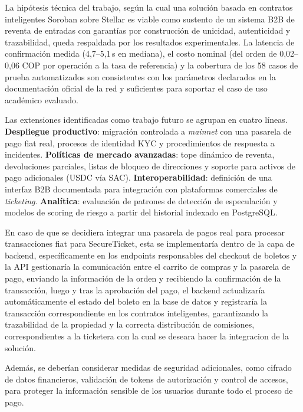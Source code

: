 La hipótesis técnica del trabajo, según la cual una solución basada en contratos inteligentes Soroban sobre
Stellar es viable como sustento de un sistema B2B de reventa de entradas con garantías por construcción de
unicidad, autenticidad y trazabilidad, queda respaldada por los resultados experimentales. La latencia de
confirmación medida (4{,}7--5{,}1\,s en mediana), el costo nominal (del orden de 0{,}02--0{,}06 COP por
operación a la tasa de referencia) y la cobertura de los 58 casos de prueba automatizados son consistentes
con los parámetros declarados en la documentación oficial de la red y suficientes para soportar el caso de
uso académico evaluado.

Las extensiones identificadas como trabajo futuro se agrupan en cuatro líneas. \textbf{Despliegue
productivo}: migración controlada a \textit{mainnet} con una pasarela de pago fiat real, procesos de
identidad KYC y procedimientos de respuesta a incidentes. \textbf{Políticas de mercado avanzadas}: tope
dinámico de reventa, devoluciones parciales, listas de bloqueo de direcciones y soporte para activos de pago
adicionales (USDC vía SAC). \textbf{Interoperabilidad}: definición de una interfaz B2B documentada para
integración con plataformas comerciales de \textit{ticketing}. \textbf{Analítica}: evaluación de patrones de
detección de especulación y modelos de scoring de riesgo a partir del historial indexado en PostgreSQL.

En caso de que se decidiera integrar una pasarela de pagos real para procesar transacciones fiat para SecureTicket, esta se implementaría dentro de la capa de backend, específicamente en los endpoints responsables del checkout de boletos y la API gestionaría la comunicación entre el carrito de compras y la pasarela de pago, enviando la información de la orden y recibiendo la confirmación de la transacción, luego y tras la aprobación del pago, el backend actualizaría automáticamente el estado del boleto en la base de datos y registraría la transacción correspondiente en los contratos inteligentes, garantizando la trazabilidad de la propiedad y la correcta distribución de comisiones, correspondientes a la ticketera con la cual se deseara hacer la integracion de la solución. 

Además, se deberían considerar medidas de seguridad adicionales, como cifrado de datos financieros, validación de tokens de autorización y control de accesos, para proteger la información sensible de los usuarios durante todo el proceso de pago.
